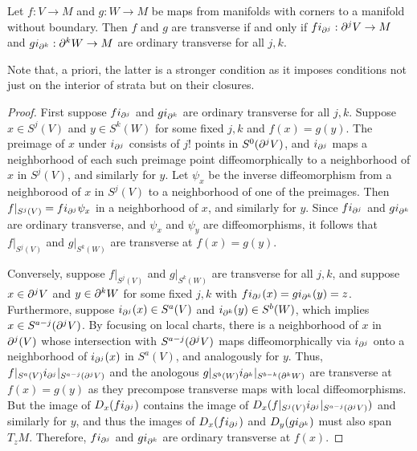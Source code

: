 \begin{lemma}\label{L: simple trans}
Let $f:V\to M$ and $g:W\to M$ be maps from manifolds with corners to a manifold without boundary. Then $f$ and $g$ are transverse if and only if $fi_{\partial^j}:\partial^jV\to M$ and $gi_{\partial^k}:\partial^kW \to M$ are ordinary transverse for all $j,k$.
\end{lemma}
Note that, a priori, the latter is a stronger condition as it imposes conditions not just on the interior of strata but on their closures.
\begin{proof}


First suppose $fi_{\partial^j}$ and $gi_{\partial^k}$ are ordinary transverse for all $j,k$. Suppose $x\in S^j(V)$ and $y\in S^k(W)$ for some fixed $j,k$ and $f(x)=g(y)$. The preimage of $x$ under $i_{\partial^j}$ consists of $j!$ points in $S^0(\partial^jV)$, and $i_{\partial^j}$ maps a neighborhood of each such preimage point diffeomorphically to a neighborhood of $x$ in $S^j(V)$, and similarly for $y$. Let $\psi_x$ be the inverse diffeomorphism from a neighborood of $x$ in $S^j(V)$ to a neighborhood of one of the preimages. Then $f|_{S^j(V)}=fi_{\partial^j}\psi_x$ in a neighborhood of $x$, and similarly for $y$.
Since $fi_{\partial^j}$ and $gi_{\partial^k}$ are ordinary transverse, and $\psi_x$ and $\psi_y$ are diffeomorphisms, it follows that $f|_{S^j(V)}$ and $g|_{S^k(W)}$ are transverse at $f(x)=g(y)$.

Conversely, suppose $f|_{S^j(V)}$ and $g|_{S^k(W)}$ are transverse for all $j,k$, and suppose $x\in \partial^jV$ and $y\in \partial^kW$ for some fixed $j,k$ with $fi_{\partial^j}(x)=gi_{\partial^k}(y)=z$. Furthermore, suppose $i_{\partial^j}(x)\in S^a(V)$ and $i_{\partial^k}(y)\in S^b(W)$, which implies $x\in S^{a-j}(\partial^j V)$. By focusing on local charts, there is a neighborhood of $x$ in $\partial^j(V)$ whose intersection with $S^{a-j}(\partial^j V)$ maps diffeomorphically via $i_{\partial^j}$ onto a neighborhood of $i_{\partial^j}(x)$ in $S^a(V)$, and analogously for $y$. Thus, $f|_{S^a(V)}i_{\partial^j}|_{S^{a-j}(\partial^j V)}$ and the anologous $g|_{S^b(W)}i_{\partial^k}|_{S^{b-k}(\partial^k W)}$ are transverse at $f(x)=g(y)$ as they precompose transverse maps with local diffeomorphisms. But the image of $D_x(fi_{\partial^j})$ contains the image of $D_x(f|_{S^j(V)}i_{\partial^j}|_{S^{a-j}(\partial^j V)})$ and similarly for $y$, and thus the images of $D_x(fi_{\partial^j})$ and $D_y(gi_{\partial^k})$ must also span $T_{z}M$. Therefore, $fi_{\partial^j}$ and $gi_{\partial^k}$ are ordinary transverse at $f(x)$.
\end{proof}





